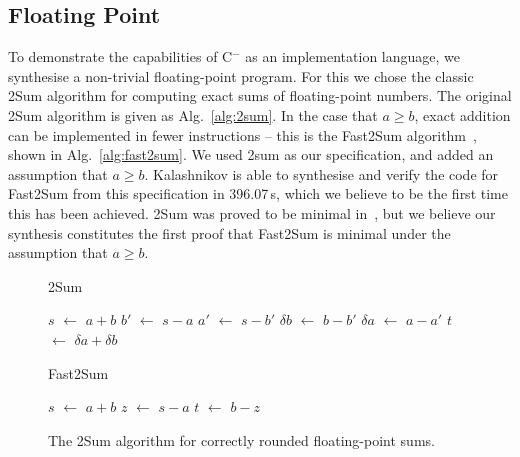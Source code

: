 \documentclass[a4paper]{llncs}
\newcommand{\newC}{C$^-$\xspace}
\newcommand*\Let[2]{\State #1 $\gets$ #2}
\begin{document}
\subsection{Floating Point}
To demonstrate the capabilities of \newC as an implementation language, we synthesise a
non-trivial floating-point program.  For this we chose the classic {\sc 2Sum} algorithm for computing
exact sums of floating-point numbers.  The original {\sc 2Sum} algorithm is given as Alg.~\ref{alg:2sum}.
In the case that $a \ge b$, exact addition can be implemented in fewer instructions -- this is the
{\sc Fast2Sum} algorithm~\cite{fast2sum}, shown in Alg.~\ref{alg:fast2sum}.  We used {\sc 2sum} as our specification, and
added an assumption that $a \ge b$.  {\sc Kalashnikov} is able to synthesise and verify the
code for {\sc Fast2Sum} from this specification in 396.07\,s, which we believe to be the first time
this has been achieved.  {\sc 2Sum} was proved to be minimal in~\cite{fast2sum}, but
we believe our synthesis constitutes the first proof that {\sc Fast2Sum} is
minimal under the assumption that $a \ge b$.

\begin{figure}[ht]
\begin{center}
\begin{minipage}[t]{0.45\linewidth}
\begin{algorithm}[H]
\caption{\sc 2Sum
 \label{alg:2sum}}
\begin{algorithmic}
\Let{$s$}{$a+b$}
\Let{$b'$}{$s - a$}
\Let{$a'$}{$s - b'$}
\Let{$\delta b$}{$b - b'$}
\Let{$\delta a$}{$a - a'$}
\Let{$t$}{$\delta a + \delta b$}
\end{algorithmic}
\end{algorithm}
\end{minipage}
\hfill
\begin{minipage}[t]{0.45\linewidth}
\begin{algorithm}[H]
\caption{\sc Fast2Sum
 \label{alg:fast2sum}}
\begin{algorithmic}
\Let{$s$}{$a + b$}
\Let{$z$}{$s - a$}
\Let{$t$}{$b - z$}
\end{algorithmic}
\end{algorithm}
\end{minipage}
\end{center}


 \caption{The {\sc 2Sum} algorithm for correctly rounded floating-point sums.}
  \label{fig:2sum}
\end{figure}
\end{document}
